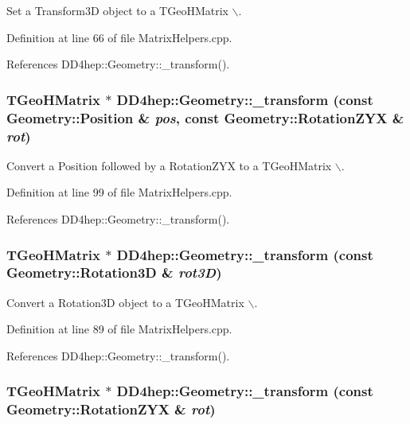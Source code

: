 Set a Transform3D object to a TGeoHMatrix $\backslash$. 

Definition at line 66 of file MatrixHelpers.cpp.

References DD4hep::Geometry::\_\-transform().\hypertarget{group___d_d4_h_e_p___g_e_o_m_e_t_r_y_gad6f7e93a5f8c5ae037658aa594d2f83b}{
\subsubsection[{\_\-transform}]{\setlength{\rightskip}{0pt plus 5cm}TGeoHMatrix $\ast$ DD4hep::Geometry::\_\-transform (const Geometry::Position \& {\em pos}, \/  const Geometry::RotationZYX \& {\em rot})}}
\label{group___d_d4_h_e_p___g_e_o_m_e_t_r_y_gad6f7e93a5f8c5ae037658aa594d2f83b}


Convert a Position followed by a RotationZYX to a TGeoHMatrix $\backslash$. 

Definition at line 99 of file MatrixHelpers.cpp.

References DD4hep::Geometry::\_\-transform().\hypertarget{group___d_d4_h_e_p___g_e_o_m_e_t_r_y_ga2b988c5fb8e427e757080009b3a4856f}{
\subsubsection[{\_\-transform}]{\setlength{\rightskip}{0pt plus 5cm}TGeoHMatrix $\ast$ DD4hep::Geometry::\_\-transform (const Geometry::Rotation3D \& {\em rot3D})}}
\label{group___d_d4_h_e_p___g_e_o_m_e_t_r_y_ga2b988c5fb8e427e757080009b3a4856f}


Convert a Rotation3D object to a TGeoHMatrix $\backslash$. 

Definition at line 89 of file MatrixHelpers.cpp.

References DD4hep::Geometry::\_\-transform().\hypertarget{group___d_d4_h_e_p___g_e_o_m_e_t_r_y_gaf3a07560a5302fbb20eed5a933e611d8}{
\subsubsection[{\_\-transform}]{\setlength{\rightskip}{0pt plus 5cm}TGeoHMatrix $\ast$ DD4hep::Geometry::\_\-transform (const Geometry::RotationZYX \& {\em rot})}}
\label{group___d_d4_h_e_p___g_e_o_m_e_t_r_y_gaf3a07560a5302fbb20eed5a933e611d8}


